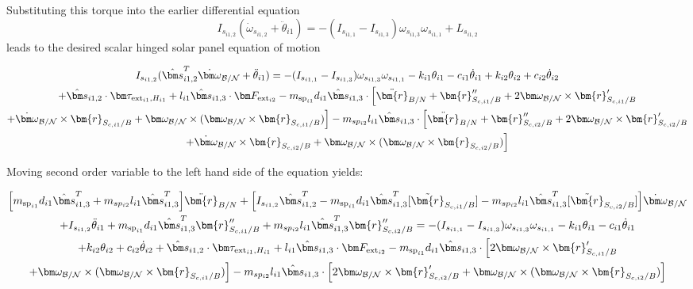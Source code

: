 Substituting this torque into the earlier differential equation
\begin{equation}
	I_{s_{i1,2}} ( \dot\omega_{s_{i1,2}} + \ddot\theta_{i1}) = - (I_{s_{i1,1}} - I_{s_{i1,3}}) \omega_{s_{i1,3}} \omega_{s_{i1,1}} + L_{s_{i1,2}}
\end{equation}
leads to the desired scalar hinged solar panel equation of motion

\begin{multline}
	I_{s_{i1,2}} ( \hat{\bm s}_{i1,2}^T \dot{\bm\omega}_{\cal B/N} + \ddot\theta_{i1}) = - (I_{s_{i1,1}} - I_{s_{i1,3}}) \omega_{s_{i1,3}} \omega_{s_{i1,1}} - k_{i1} \theta_{i1} - c_{i1}\dot{\theta}_{i1} +  k_{i2} \theta_{i2} + c_{i2} \dot\theta_{i2} \\
	+ \hat{\bm s}_{i1,2} \cdot \bm \tau_{\text{ext}_{i1},H_{i1}} + l_{i1} \hat{\bm s}_{i1,3} \cdot \bm F_{\text{ext}_{i2}}
	- m_{\text{sp}_{i1}} d_{i1} \hat{\bm s}_{i1,3} \cdot \Big[\ddot{\bm{r}}_{B/N} + \bm{r}''_{S_{c,i1}/B} + 2 \bm\omega_{\cal B/N} \times \bm{r}'_{S_{c,i1}/B} \\
	+  \dot{\bm\omega}_{\cal B/N} \times \bm{r}_{S_{c,i1}/B}
	+ \bm\omega_{\cal B/N} \times (\bm\omega_{\cal B/N} \times \bm{r}_{S_{c,i1}/B})\Big]
	- m_{sp_{i2}} l_{i1} \hat{\bm s}_{i1,3} \cdot \Big[\ddot{\bm{r}}_{B/N} + \bm{r}''_{S_{c,i2}/B} + 2 \bm\omega_{\cal B/N} \times \bm{r}'_{S_{c,i2}/B} \\
	+  \dot{\bm\omega}_{\cal B/N} \times \bm{r}_{S_{c,i2}/B} + \bm\omega_{\cal B/N} \times (\bm\omega_{\cal B/N} \times \bm{r}_{S_{c,i2}/B})\Big]
\end{multline}

Moving second order variable to the left hand side of the equation yields:

\begin{multline}
	\Big[m_{\text{sp}_{i1}} d_{i1} \hat{\bm s}_{i1,3}^T + m_{sp_{i2}} l_{i1} \hat{\bm s}_{i1,3}^T \Big] \ddot{\bm{r}}_{B/N} + \Big[I_{s_{i1,2}} \hat{\bm s}_{i1,2}^T - m_{\text{sp}_{i1}} d_{i1} \hat{\bm s}_{i1,3}^T [\tilde{\bm{r}}_{S_{c,i1}/B}] - m_{sp_{i2}} l_{i1} \hat{\bm s}_{i1,3}^T [\tilde{\bm{r}}_{S_{c,i2}/B}] \Big]\dot{\bm\omega}_{\cal B/N} \\
	+ I_{s_{i1,2}} \ddot\theta_{i1} + m_{\text{sp}_{i1}} d_{i1} \hat{\bm s}_{i1,3}^T \bm{r}''_{S_{c,i1}/B}
	+ m_{sp_{i2}} l_{i1} \hat{\bm s}_{i1,3}^T \bm{r}''_{S_{c,i2}/B}
	= - (I_{s_{i1,1}} - I_{s_{i1,3}}) \omega_{s_{i1,3}} \omega_{s_{i1,1}} - k_{i1} \theta_{i1} - c_{i1}\dot{\theta}_{i1} \\
	+  k_{i2} \theta_{i2} + c_{i2} \dot\theta_{i2}
	+ \hat{\bm s}_{i1,2} \cdot \bm \tau_{\text{ext}_{i1},H_{i1}} + l_{i1} \hat{\bm s}_{i1,3} \cdot \bm F_{\text{ext}_{i2}}
	- m_{\text{sp}_{i1}} d_{i1} \hat{\bm s}_{i1,3} \cdot \Big[2 \bm\omega_{\cal B/N} \times \bm{r}'_{S_{c,i1}/B} \\
	+ \bm\omega_{\cal B/N} \times (\bm\omega_{\cal B/N} \times \bm{r}_{S_{c,i1}/B})\Big]
	- m_{sp_{i2}} l_{i1} \hat{\bm s}_{i1,3} \cdot \Big[ 2 \bm\omega_{\cal B/N} \times \bm{r}'_{S_{c,i2}/B}
	+ \bm\omega_{\cal B/N} \times (\bm\omega_{\cal B/N} \times \bm{r}_{S_{c,i2}/B})\Big]
\end{multline}


